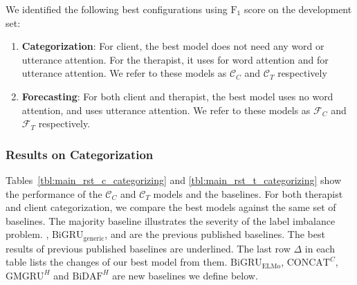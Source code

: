 We identified the following best configurations using $\text{F}_{1}$
score on the development set:
\begin{enumerate}[nosep]
\item {\bf Categorization}: For client, the best model does not need any
  word or utterance attention. For the therapist, it uses \GMGRUH
  for word attention and \anchor for utterance attention. We refer
  to these models as $\mathcal{C}_C$ and $\mathcal{C}_T$ respectively
\item {\bf Forecasting}: For both client and  therapist, the best
  model uses no word attention, and uses \self utterance
  attention. We refer to these models as $\mathcal{F}_C$ and
  $\mathcal{F}_T$ respectively.
\end{enumerate}

\subsubsection{Results on Categorization}
\label{sssec:snt:results-categorication}
Tables~\ref{tbl:main_rst_c_categorizing} and
\ref{tbl:main_rst_t_categorizing} show the performance of the
$\mathcal{C}_C$ and $\mathcal{C}_T$ models and the baselines.
%
For both therapist and client categorization, we compare the best
models against the same set of baselines. The majority baseline
illustrates the severity of the label imbalance
problem. \citet{xiao2016behavioral}, $\text{BiGRU}_{\text{generic}}$,
\citet{can2015dialog} and \citet{tanana2016comparison} are the
previous published baselines. The best results of previous published
baselines are underlined. The last row
$\Delta$ in each table lists the changes of our best model from
them. $\text{BiGRU}_{\text{ELMo}}$, $\text{CONCAT}^{C}$,
$\text{GMGRU}^{H}$ and $\text{BiDAF}^{H}$ are new baselines
we define below.

